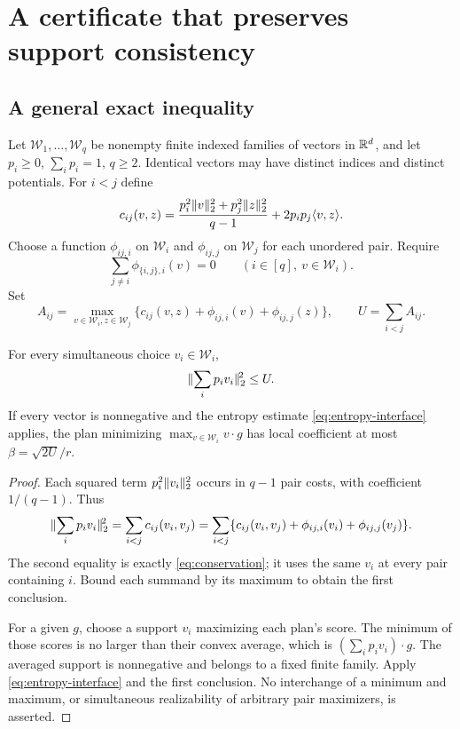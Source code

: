 \section{A certificate that preserves support consistency}
\label{sec:consistency}

\subsection{A general exact inequality}

Let $\mathcal W_1,\ldots,\mathcal W_q$ be nonempty finite indexed families
of vectors in $\mathbb R^d$, and let $p_i\ge0$, $\sum_i p_i=1$, $q\ge2$.
Identical vectors may have distinct indices and distinct potentials.
For $i<j$ define
\[
 c_{ij}(v,z)=\frac{p_i^2\lVert v\rVert_2^2+p_j^2\lVert z\rVert_2^2}{q-1}
                     +2p_ip_j\langle v,z\rangle.
\]
Choose a function $\phi_{ij,i}$ on $\mathcal W_i$ and
$\phi_{ij,j}$ on $\mathcal W_j$ for each unordered pair. Require
\begin{equation}\label{eq:conservation}
 \sum_{j\ne i}\phi_{\{i,j\},i}(v)=0
 \qquad(i\in[q],\ v\in\mathcal W_i).
\end{equation}
Set
\begin{equation}\label{eq:pair-certificate}
 A_{ij}=\max_{v\in\mathcal W_i,z\in\mathcal W_j}
 \{c_{ij}(v,z)+\phi_{ij,i}(v)+\phi_{ij,j}(z)\},
 \qquad U=\sum_{i<j}A_{ij}.
\end{equation}

\begin{theorem}\label{thm:consistency}
For every simultaneous choice $v_i\in\mathcal W_i$,
\[
 \lVert\sum_i p_i v_i\rVert_2^{\!2}\le U.
\]
If every vector is nonnegative and the entropy estimate
\eqref{eq:entropy-interface} applies, the plan minimizing
$\max_{v\in\mathcal W_i}v\cdot g$ has local coefficient at most
$\beta=\sqrt{2U}/r$.
\end{theorem}
\begin{proof}
Each squared term $p_i^2\lVert v_i\rVert_2^2$ occurs in $q-1$ pair costs, with
coefficient $1/(q-1)$. Thus
\[
 \lVert\sum_i p_i v_i\rVert_2^{\!2}
 =\sum_{i<j}c_{ij}(v_i,v_j)
 =\sum_{i<j}\{c_{ij}(v_i,v_j)+\phi_{ij,i}(v_i)+\phi_{ij,j}(v_j)\}.
\]
The second equality is exactly \eqref{eq:conservation}; it uses the same
$v_i$ at every pair containing $i$. Bound each summand by its maximum to
obtain the first conclusion.

For a given $g$, choose a support $v_i$ maximizing each plan's score.
The minimum of those scores is no larger than their convex average,
which is $(\sum_i p_i v_i)\cdot g$. The averaged support is nonnegative
and belongs to a fixed finite family. Apply
\eqref{eq:entropy-interface} and the first conclusion. No interchange of
a minimum and maximum, or simultaneous realizability of arbitrary pair
maximizers, is asserted.
\end{proof}


